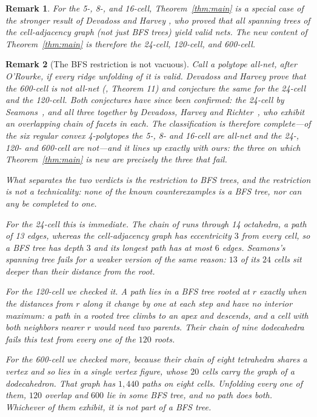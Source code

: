 \documentclass[11pt,letterpaper]{article}
\newtheorem{remark}{Remark}
\begin{document}
\begin{remark}
For the 5-, 8-, and 16-cell, Theorem~\ref{thm:main} is a special
case of the stronger result of Devadoss and Harvey
\cite{DevadossHarvey2022}, who proved that \emph{all} spanning trees
of the cell-adjacency graph (not just BFS trees) yield valid nets.
The new content of Theorem~\ref{thm:main} is therefore the 24-cell,
120-cell, and 600-cell.
\end{remark}

\begin{remark}[The BFS restriction is not vacuous]
\label{rem:notallnet}
Call a polytope \emph{all-net}, after O'Rourke, if \emph{every} ridge
unfolding of it is valid.
Devadoss and Harvey prove that the 600-cell is not all-net
(\cite{DevadossHarvey2022}, Theorem 11) and conjecture the same for the
24-cell and the 120-cell.
Both conjectures have since been confirmed: the 24-cell by
Seamons~\cite{Seamons2026}, and all three together by Devadoss, Harvey and
Richter~\cite{DevadossHarveyRichter2026}, who exhibit an overlapping chain
of facets in each.
The classification is therefore complete---of the six regular convex
4-polytopes the 5-, 8- and 16-cell are all-net and the 24-, 120- and
600-cell are not---and it lines up exactly with ours: the three on which
Theorem~\ref{thm:main} is new are precisely the three that fail.

What separates the two verdicts is the restriction to BFS trees, and the
restriction is not a technicality: none of the known counterexamples is a
BFS tree, nor can any be completed to one.

For the 24-cell this is immediate.
The chain of \cite{DevadossHarveyRichter2026} runs through 14 octahedra, a
path of 13 edges, whereas the cell-adjacency graph has eccentricity $3$
from every cell, so a BFS tree has depth $3$ and its longest path has at
most $6$ edges.
Seamons's spanning tree fails for a weaker version of the same reason:
$13$ of its $24$ cells sit deeper than their distance from the root.

For the 120-cell we checked it.
A path lies in a BFS tree rooted at $r$ exactly when the distances from
$r$ along it change by one at each step and have no interior maximum: a
path in a rooted tree climbs to an apex and descends, and a cell with both
neighbors nearer $r$ would need two parents.
Their chain of nine dodecahedra fails this test from every one of the
$120$ roots.

For the 600-cell we checked more, because their chain of eight tetrahedra
shares a vertex and so lies in a single vertex figure, whose $20$ cells
carry the graph of a dodecahedron.
That graph has $1{,}440$ paths on eight cells.
Unfolding every one of them, $120$ overlap and $600$ lie in some BFS tree,
and no path does both.
Whichever of them \cite{DevadossHarveyRichter2026} exhibit, it is not part
of a BFS tree.
\end{remark}
\end{document}
